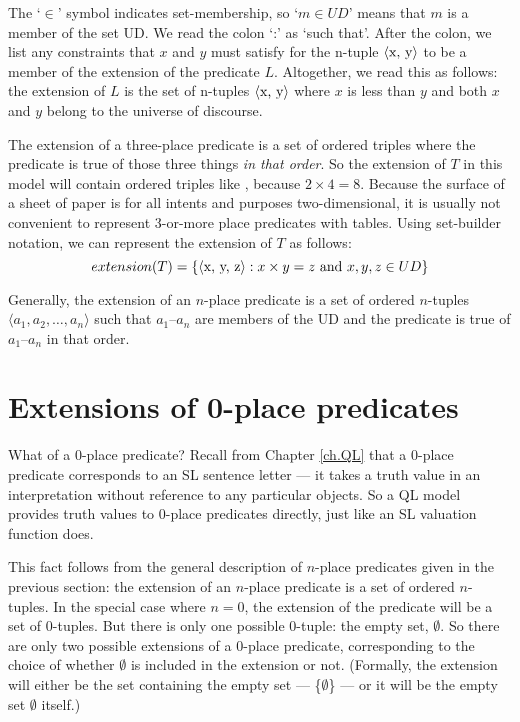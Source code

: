{\color{black}The `$\in$' symbol indicates set-membership, so `$m \in UD$' means that $m$ is a member of the set UD. We read the colon `:' as `such that'. After the colon, we list any constraints that $x$ and $y$ must satisfy for the n-tuple $\mbox{\ensuremath{\mathopen{\langle}}x, y\ensuremath{\mathclose{\rangle}}}$ to be a member of the extension of the predicate $L$. Altogether, we read this as follows: the extension of $L$ is the set of n-tuples $\mbox{\ensuremath{\mathopen{\langle}}x, y\ensuremath{\mathclose{\rangle}}}$ where $x$ is less than $y$ and both $x$ and $y$ belong to the universe of discourse.}

The extension of a three-place predicate is a set of ordered triples where the predicate is true of those three things \emph{in that order}. So the extension of $T$ in this model will contain ordered triples like , because $2\times 4 = 8$. Because the surface of a sheet of paper is for all intents and purposes two-dimensional, it is usually not convenient to represent 3-or-more place predicates with tables. {\color{black} Using set-builder notation, we can represent the extension of $T$ as follows:} $$extension(T) = \{ \mbox{\ensuremath{\mathopen{\langle}}x, y, z\ensuremath{\mathclose{\rangle}}} : x \times y = z \textrm{ and } x, y, z \in UD \}$$

Generally, the extension of an $n$-place predicate is a set of ordered $n$-tuples ${\langle}a_1, a_2,\ldots, a_n{\rangle}$ such that $a_1$--$a_n$ are members of the UD and the predicate is true of $a_1$--$a_n$ in that order.


\section{Extensions of 0-place predicates}
\label{sec.0PlaceModels}

What of a 0-place predicate? Recall from Chapter \ref{ch.QL} that a 0-place predicate corresponds to an SL sentence letter --- it takes a truth value in an interpretation without reference to any particular objects. So a QL model provides truth values to 0-place predicates directly, just like an SL valuation function does.

This fact follows from the general description of $n$-place predicates given in the previous section: the extension of an $n$-place predicate is a set of ordered $n$-tuples. In the special case where $n=0$, the extension of the predicate will be a set of 0-tuples. But there is only one possible 0-tuple: the empty set, $\emptyset$. So there are only two possible extensions of a 0-place predicate, corresponding to the choice of whether $\emptyset$ is included in the extension or not. (Formally, the extension will either be the set containing the empty set --- \{$\emptyset$\} --- or it will be the empty set $\emptyset$ itself.)


